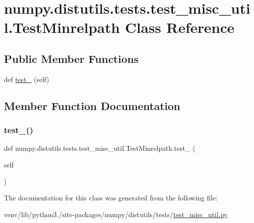 \hypertarget{classnumpy_1_1distutils_1_1tests_1_1test__misc__util_1_1TestMinrelpath}{}\section{numpy.\+distutils.\+tests.\+test\+\_\+misc\+\_\+util.\+Test\+Minrelpath Class Reference}
\label{classnumpy_1_1distutils_1_1tests_1_1test__misc__util_1_1TestMinrelpath}
\subsection*{Public Member Functions}
\begin{DoxyCompactItemize}
\item 
def \hyperlink{classnumpy_1_1distutils_1_1tests_1_1test__misc__util_1_1TestMinrelpath_ae1fbbaf31ef67bf8c007328d396e44c0}{test\+\_} (self)
\end{DoxyCompactItemize}


\subsection{Member Function Documentation}
\mbox{\label{classnumpy_1_1distutils_1_1tests_1_1test__misc__util_1_1TestMinrelpath_ae1fbbaf31ef67bf8c007328d396e44c0}} 
\subsubsection{\texorpdfstring{test\+\_()}{test\_1()}}
{\footnotesize\ttfamily def numpy.\+distutils.\+tests.\+test\+\_\+misc\+\_\+util.\+Test\+Minrelpath.\+test\+\_ (\begin{DoxyParamCaption}\item[{}]{self }\end{DoxyParamCaption})}



The documentation for this class was generated from the following file\+:\begin{DoxyCompactItemize}
\item 
venv/lib/python3./site-\/packages/numpy/distutils/tests/\hyperlink{test__misc__util_8py}{test\+\_\+misc\+\_\+util.\+py}\end{DoxyCompactItemize}
